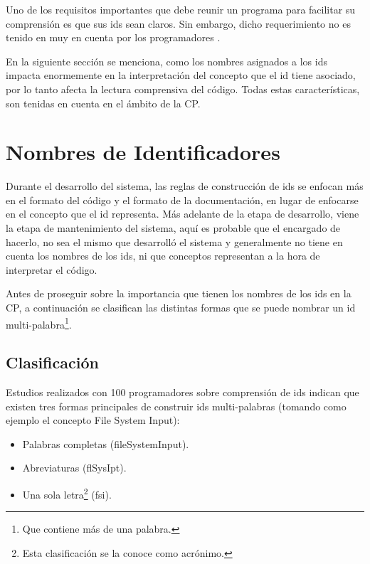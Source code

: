 Uno de los requisitos importantes que debe reunir un programa para facilitar su comprensión es que sus ids sean claros. Sin embargo, dicho requerimiento no es tenido en muy en cuenta por los programadores \cite{DFPM05,DLHD06,DCHD06,LDFHB07}.

En la siguiente sección se menciona, como los nombres asignados a los ids impacta enormemente en la interpretación del concepto que el id tiene asociado, por lo tanto afecta la lectura comprensiva del código. Todas estas características, son tenidas en cuenta en el ámbito de la CP.


\section{Nombres de Identificadores}

Durante el desarrollo del sistema, las reglas de construcción de ids se enfocan más en el formato del código y el formato de la documentación, en lugar de enfocarse en el concepto que el id representa. Más adelante de la etapa de desarrollo, viene la etapa de mantenimiento del sistema, aquí es probable que el encargado de hacerlo, no sea el mismo que desarrolló el sistema y generalmente no tiene en cuenta los nombres de los ids, ni que conceptos representan a la hora de interpretar el código.


Antes de proseguir sobre la importancia que tienen los nombres de los ids en la CP, a continuación se clasifican las distintas formas que se puede nombrar un id multi-palabra\footnote[1]{Que contiene más de una palabra.}.

\subsection{Clasificación}
\label{sec:clasif}%

Estudios realizados con 100 programadores \cite{DCHD06} sobre comprensión de ids indican que existen tres formas principales de construir ids multi-palabras (tomando como ejemplo el concepto \textsf{File System Input}): 

\begin{itemize}
\itemsep0em%
\item Palabras completas (\textsf{fileSystemInput}).
\item Abreviaturas (\textsf{flSysIpt}).
\item Una sola letra\footnote[2]{Esta clasificación se la conoce como acrónimo.} (\textsf{fsi}). 
\end{itemize}

